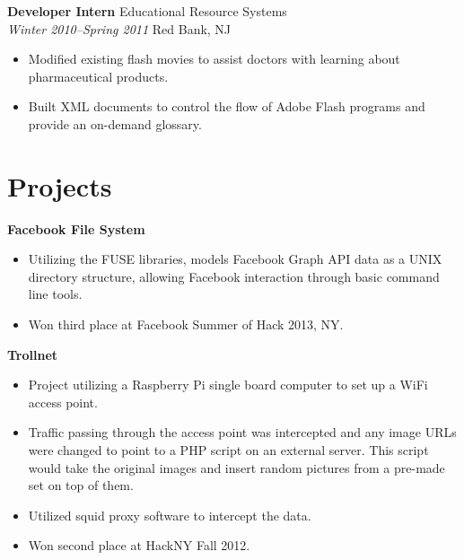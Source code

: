 \documentclass[centered,overlapped]{res}
\begin{document}
\begin{resume}
{\bf Developer Intern} \hfill Educational Resource Systems\\
\textit{Winter 2010--Spring 2011} \hfill  Red Bank, NJ
\begin{itemize} \itemsep -2pt %
	\item Modified existing flash movies to assist doctors with learning about pharmaceutical products.
	\item Built XML documents to control the flow of Adobe Flash programs and provide an on-demand glossary.
\end{itemize}


\section{Projects}

	{\bf Facebook File System}
	\begin{itemize} \itemsep -2pt
		\item Utilizing the FUSE libraries, models Facebook Graph API data as a
            UNIX directory structure, allowing Facebook interaction through
            basic command line tools.
        \item Won third place at Facebook Summer of Hack 2013, NY.
	\end{itemize}

	{\bf Trollnet}
	\begin{itemize} \itemsep -2pt
		\item Project utilizing a Raspberry Pi single board computer to set up a WiFi access point.
        \item Traffic passing through the access point was intercepted and any
            image URLs were changed to point to a PHP script on an external
            server. This script would take the original images and insert random
            pictures from a pre-made set on top of them.
		\item Utilized squid proxy software to intercept the data.
		\item Won second place at HackNY Fall 2012.
	\end{itemize}


\end{resume}
\end{document}
